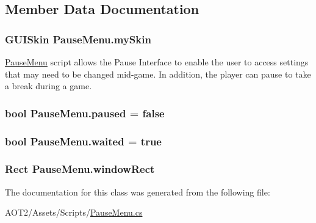 \subsection{Member Data Documentation}
\hypertarget{class_pause_menu_af78d9844a86f8ffb0ebf4d711fe0c2ce}{
\subsubsection[{my\-Skin}]{\setlength{\rightskip}{0pt plus 5cm}G\-U\-I\-Skin Pause\-Menu.\-my\-Skin}}\label{class_pause_menu_af78d9844a86f8ffb0ebf4d711fe0c2ce}
\hyperlink{class_pause_menu}{Pause\-Menu} script allows the Pause Interface to enable the user to access settings that may need to be changed mid-\/game. In addition, the player can pause to take a break during a game. \hypertarget{class_pause_menu_a5ebc8c7d38ad3c1be68a741fb133e6a2}{
\subsubsection[{paused}]{\setlength{\rightskip}{0pt plus 5cm}bool Pause\-Menu.\-paused = false\hspace{0.3cm}{\ttfamily [private]}}}\label{class_pause_menu_a5ebc8c7d38ad3c1be68a741fb133e6a2}
\hypertarget{class_pause_menu_a73081e2e0173f8cda0bb890d4b84b722}{
\subsubsection[{waited}]{\setlength{\rightskip}{0pt plus 5cm}bool Pause\-Menu.\-waited = true\hspace{0.3cm}{\ttfamily [private]}}}\label{class_pause_menu_a73081e2e0173f8cda0bb890d4b84b722}
\hypertarget{class_pause_menu_a5cbd090dfd1fd8cd9d745d1334dad5cb}{
\subsubsection[{window\-Rect}]{\setlength{\rightskip}{0pt plus 5cm}Rect Pause\-Menu.\-window\-Rect\hspace{0.3cm}{\ttfamily [private]}}}\label{class_pause_menu_a5cbd090dfd1fd8cd9d745d1334dad5cb}


The documentation for this class was generated from the following file\-:\begin{DoxyCompactItemize}
\item 
A\-O\-T2/\-Assets/\-Scripts/\hyperlink{_pause_menu_8cs}{Pause\-Menu.\-cs}\end{DoxyCompactItemize}
